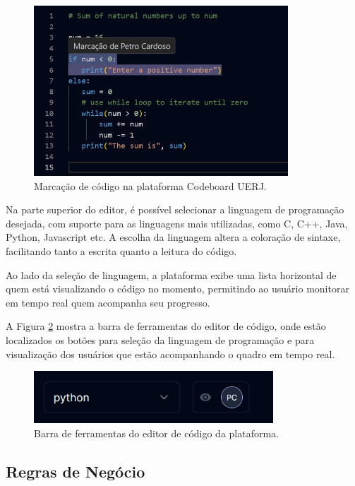 \begin{figure}[H]
    \centering
    \caption{Marcação de código na plataforma Codeboard UERJ.}
    \label{fig:code-editor-user-highlight}
    \includegraphics[width=0.85\textwidth]{assets/codeboard/code-editor-user-highlight.png}
\end{figure}

Na parte superior do editor, é possível selecionar a linguagem de programação desejada, com suporte para as linguagens mais utilizadas, como C, C++, Java, Python, Javascript etc. A escolha da linguagem altera a coloração de sintaxe, facilitando tanto a escrita quanto a leitura do código. 

Ao lado da seleção de linguagem, a plataforma exibe uma lista horizontal de quem está visualizando o código no momento, permitindo ao usuário monitorar em tempo real quem acompanha seu progresso.

A Figura \ref{fig:code-editor-toolbar} mostra a barra de ferramentas do editor de código, onde estão localizados os botões para seleção da linguagem de programação e para visualização dos usuários que estão acompanhando o quadro em tempo real.

\begin{figure}[H]
    \centering
    \caption{Barra de ferramentas do editor de código da plataforma.}
    \label{fig:code-editor-toolbar}
    \includegraphics[width=0.8\textwidth]{assets/codeboard/code-editor-toolbar.png}
\end{figure}


\subsection{Regras de Negócio}

